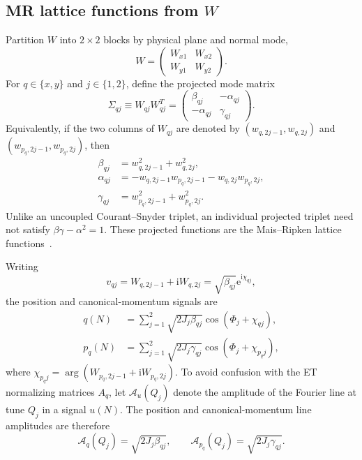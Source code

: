 \documentclass[11pt,a4paper]{article}
\newcommand{\ii}{\mathrm{i}}
\newcommand{\e}{\mathrm{e}}
\begin{document}
\subsection{MR lattice functions from $W$}

Partition $W$ into $2\times2$ blocks by physical plane and normal mode,
\begin{equation}
 W=
 \begin{pmatrix}
  W_{x1}&W_{x2}\\
  W_{y1}&W_{y2}
 \end{pmatrix}.
\end{equation}
For $q\in\{x,y\}$ and $j\in\{1,2\}$, define the projected mode matrix
\begin{equation}
 \Sigma_{qj}\equiv W_{qj}W_{qj}^T
 =
 \begin{pmatrix}
  \beta_{qj}&-\alpha_{qj}\\
  -\alpha_{qj}&\gamma_{qj}
 \end{pmatrix}.
 \label{eq:mr-sigma}
\end{equation}
Equivalently, if the two columns of $W_{qj}$ are denoted by $(w_{q,2j-1},w_{q,2j})$ and $(w_{p_q,2j-1},w_{p_q,2j})$, then
\begin{align}
 \beta_{qj}&=w_{q,2j-1}^2+w_{q,2j}^2,\\
 \alpha_{qj}&=-w_{q,2j-1}w_{p_q,2j-1}
               -w_{q,2j}w_{p_q,2j},\\
 \gamma_{qj}&=w_{p_q,2j-1}^2+w_{p_q,2j}^2.
 \label{eq:mr-functions-from-w}
\end{align}
Unlike an uncoupled Courant--Snyder triplet, an individual projected triplet need not satisfy $\beta\gamma-\alpha^2=1$.
These projected functions are the Mais--Ripken lattice functions~\cite{MaisRipken,LebedevBogacz}.

Writing
\begin{equation}
 v_{qj}=W_{q,2j-1}+\ii W_{q,2j}
       =\sqrt{\beta_{qj}}\e^{\ii\chi_{qj}},
\end{equation}
the position and canonical-momentum signals are
\begin{align}
 q(N)&=\sum_{j=1}^{2}\sqrt{2J_j\beta_{qj}}
       \cos\!\left(\Phi_j+\chi_{qj}\right),
 \label{eq:mr-position}\\
 p_q(N)&=\sum_{j=1}^{2}\sqrt{2J_j\gamma_{qj}}
       \cos\!\left(\Phi_j+\chi_{p_qj}\right),
 \label{eq:mr-momentum}
\end{align}
where $\chi_{p_qj}=\arg(W_{p_q,2j-1}+\ii W_{p_q,2j})$.  To avoid confusion
with the ET normalizing matrices $A_q$, let $\mathcal A_u(Q_j)$ denote the
amplitude of the Fourier line at tune $Q_j$ in a signal $u(N)$.  The position
and canonical-momentum line amplitudes are therefore
\begin{equation}
 \mathcal A_q(Q_j)=\sqrt{2J_j\beta_{qj}},
 \qquad
 \mathcal A_{p_q}(Q_j)=\sqrt{2J_j\gamma_{qj}}.
 \label{eq:mr-line-amplitudes}
\end{equation}
\end{document}
